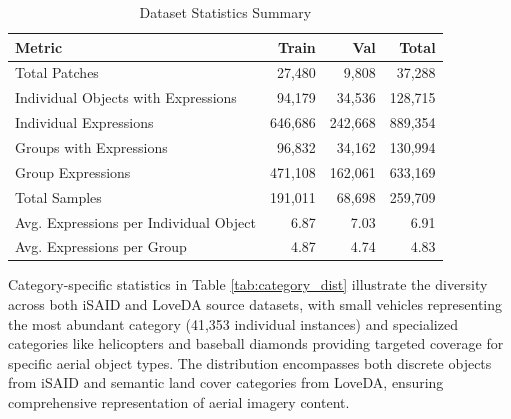 \begin{table}[H]
\centering
\caption{Dataset Statistics Summary}
\label{tab:dataset_stats}
\begin{tabular}{@{}lrrr@{}}
\toprule
\textbf{Metric} & \textbf{Train} & \textbf{Val} & \textbf{Total} \\
\midrule
Total Patches & 27,480 & 9,808 & 37,288 \\
Individual Objects with Expressions & 94,179 & 34,536 & 128,715 \\
Individual Expressions & 646,686 & 242,668 & 889,354 \\
Groups with Expressions & 96,832 & 34,162 & 130,994 \\
Group Expressions & 471,108 & 162,061 & 633,169 \\
Total Samples & 191,011 & 68,698 & 259,709 \\
Avg. Expressions per Individual Object & 6.87 & 7.03 & 6.91 \\
Avg. Expressions per Group & 4.87 & 4.74 & 4.83 \\
\bottomrule
\end{tabular}
\end{table}

Category-specific statistics in Table \ref{tab:category_dist} illustrate the diversity across both iSAID and LoveDA source datasets, with small vehicles representing the most abundant category (41,353 individual instances) and specialized categories like helicopters and baseball diamonds providing targeted coverage for specific aerial object types. The distribution encompasses both discrete objects from iSAID and semantic land cover categories from LoveDA, ensuring comprehensive representation of aerial imagery content.

